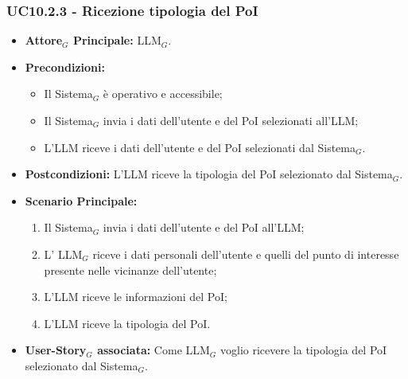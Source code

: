 \documentclass[10pt]{article}
\begin{document}
\begin{justify}
\subsubsection{\textbf{UC10.2.3 - Ricezione tipologia del PoI}}
\begin{itemize}
    \item \textbf{Attore$_G$ Principale:} LLM$_G$.
    \item \textbf{Precondizioni:} 
        \begin{itemize}
          \item Il Sistema$_G$ è operativo e accessibile;
          \item Il Sistema$_G$ invia i dati dell'utente e del PoI selezionati all'LLM;
            \item L'LLM riceve i dati dell'utente e del PoI selezionati dal Sistema$_G$.
        \end{itemize}
      \item \textbf{Postcondizioni:} L'LLM riceve la tipologia del PoI selezionato dal Sistema$_G$.
    \item \textbf{Scenario Principale:} 
        \begin{enumerate}
          \item Il Sistema$_G$ invia i dati dell'utente e del PoI all'LLM;
        \item L' LLM$_G$ riceve i dati personali dell'utente e quelli del punto di interesse presente nelle vicinanze dell'utente;
          \item L'LLM riceve le informazioni del PoI;
          \item L'LLM riceve la tipologia del PoI.
        \end{enumerate}
      \item \textbf{User-Story$_G$ associata:} Come LLM$_G$ voglio ricevere la tipologia del PoI selezionato dal Sistema$_G$.
\end{itemize}

\end{justify}
\end{document}
